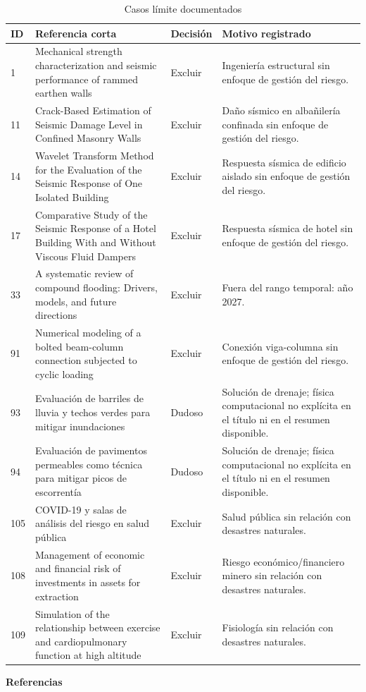 \documentclass[12pt,a4paper]{article}
\begin{document}
\begin{table}[ht]
  \centering
  \caption{Casos límite documentados}
  \label{tab:casos-limite}
  \scriptsize
  \begin{tabularx}{\textwidth}{@{}p{0.6cm}>{\raggedright\arraybackslash}X>{\centering\arraybackslash}p{1.35cm}>{\raggedright\arraybackslash}X@{}}
    \toprule
    ID & Referencia corta & Decisión & Motivo registrado \\
    \midrule
    1 & Mechanical strength characterization and seismic performance of rammed earthen walls & Excluir & Ingeniería estructural sin enfoque de gestión del riesgo. \\
    11 & Crack-Based Estimation of Seismic Damage Level in Confined Masonry Walls & Excluir & Daño sísmico en albañilería confinada sin enfoque de gestión del riesgo. \\
    14 & Wavelet Transform Method for the Evaluation of the Seismic Response of One Isolated Building & Excluir & Respuesta sísmica de edificio aislado sin enfoque de gestión del riesgo. \\
    17 & Comparative Study of the Seismic Response of a Hotel Building With and Without Viscous Fluid Dampers & Excluir & Respuesta sísmica de hotel sin enfoque de gestión del riesgo. \\
    33 & A systematic review of compound flooding: Drivers, models, and future directions & Excluir & Fuera del rango temporal: año 2027. \\
    91 & Numerical modeling of a bolted beam-column connection subjected to cyclic loading & Excluir & Conexión viga-columna sin enfoque de gestión del riesgo. \\
    93 & Evaluación de barriles de lluvia y techos verdes para mitigar inundaciones & Dudoso & Solución de drenaje; física computacional no explícita en el título ni en el resumen disponible. \\
    94 & Evaluación de pavimentos permeables como técnica para mitigar picos de escorrentía & Dudoso & Solución de drenaje; física computacional no explícita en el título ni en el resumen disponible. \\
    105 & COVID-19 y salas de análisis del riesgo en salud pública & Excluir & Salud pública sin relación con desastres naturales. \\
    108 & Management of economic and financial risk of investments in assets for extraction & Excluir & Riesgo económico/financiero minero sin relación con desastres naturales. \\
    109 & Simulation of the relationship between exercise and cardiopulmonary function at high altitude & Excluir & Fisiología sin relación con desastres naturales. \\
    \bottomrule
  \end{tabularx}
\end{table}

\newpage
\begin{center}\textbf{Referencias}\end{center}
\printbibliography[heading=none]
\end{document}
